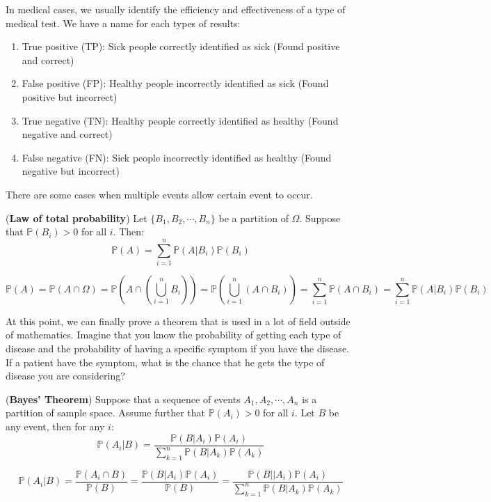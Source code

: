 \documentclass{huhtakm-template-book}
\newcommand{\prob}{\mathbb{P}}
\begin{document}
\newpage
\begin{eg}
	In medical cases, we usually identify the efficiency and effectiveness of a type of medical test. We have a name for each types of results:
	\begin{enumerate}
		\item True positive (TP): Sick people correctly identified as sick (Found positive and correct)
		\item False positive (FP): Healthy people incorrectly identified as sick (Found positive but incorrect)
		\item True negative (TN): Healthy people correctly identified as healthy (Found negative and correct)
		\item False negative (FN): Sick people incorrectly identified as healthy (Found negative but incorrect)
	\end{enumerate}
\end{eg}
There are some cases when multiple events allow certain event to occur.
\begin{lem}(\textbf{Law of total probability})
	Let $\{B_{1},B_{2},\cdots,B_{n}\}$ be a partition of $\Omega$. Suppose that $\prob(B_{i})>0$ for all $i$. Then:
	\begin{equation*}
		\prob(A)=\sum_{i=1}^{n}\prob(A|B_{i})\prob(B_{i})
	\end{equation*}
\end{lem}
\begin{proofing}
	\begin{equation*}
		\prob(A)=\prob(A\cap\Omega)=\prob\left(A\cap\left(\bigcup_{i=1}^{n}B_{i}\right)\right)=\prob\left(\bigcup_{i=1}^{n}(A\cap B_{i})\right)=\sum_{i=1}^{n}\prob(A\cap B_{i})=\sum_{i=1}^{n}\prob(A|B_{i})\prob(B_{i})
	\end{equation*}
\end{proofing}
At this point, we can finally prove a theorem that is used in a lot of field outside of mathematics. Imagine that you know the probability of getting each type of disease and the probability of having a specific symptom if you have the disease. If a patient have the symptom, what is the chance that he gets the type of disease you are considering?
\begin{thm}(\textbf{Bayes' Theorem})
	Suppose that a sequence of events $A_{1},A_{2},\cdots,A_{n}$ is a partition of sample space. Assume further that $\prob(A_{i})>0$ for all $i$. Let $B$ be any event, then for any $i$:
	\begin{equation*}
		\prob(A_{i}|B)=\frac{\prob(B|A_{i})\prob(A_{i})}{\sum_{k=1}^{n}\prob(B|A_{k})\prob(A_{k})}
	\end{equation*}
\end{thm}
\begin{proofing}
	\begin{equation*}
		\prob(A_{i}|B)=\frac{\prob(A_{i}\cap B)}{\prob(B)}=\frac{\prob(B|A_{i})\prob(A_{i})}{\prob(B)}=\frac{\prob(B||A_{i})\prob(A_{i})}{\sum_{k=1}^{n}\prob(B|A_{k})\prob(A_{k})}
	\end{equation*}
\end{proofing}
\end{document}
